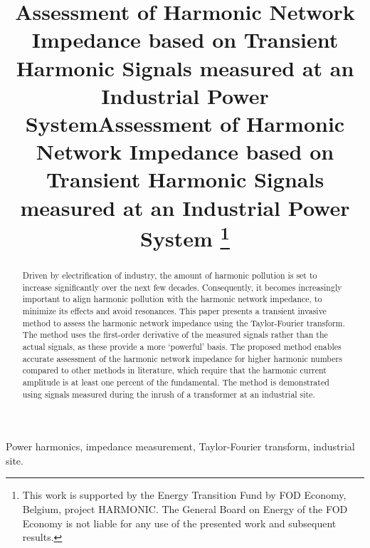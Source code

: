 \documentclass[conference]{IEEEtran}
\begin{document}
\title{Assessment of Harmonic Network Impedance based on Transient Harmonic Signals measured at an Industrial Power System}

\title{Assessment of Harmonic Network Impedance based on Transient Harmonic Signals measured at an Industrial Power System
\thanks{This work is supported by the Energy Transition Fund by FOD Economy, Belgium, project HARMONIC. The General Board on Energy of the FOD Economy is not liable for any use of the presented work and subsequent results.}}

\author{
\and
{}
\and
{}
}

\maketitle


\begin{abstract}
Driven by electrification of industry, the amount of harmonic pollution is set to increase significantly over the next few decades. Consequently, it becomes increasingly important to align harmonic pollution with the harmonic network impedance, to minimize its effects and avoid resonances. This paper presents a transient invasive method to assess the harmonic network impedance using the Taylor-Fourier transform. The method uses the first-order derivative of the measured signals rather than the actual signals, as these provide a more `powerful' basis. The proposed method enables accurate assessment of the harmonic network impedance for higher harmonic numbers compared to other methods in literature, which require that the harmonic current amplitude is at least one percent of the fundamental. The method is demonstrated using signals measured during the inrush of a transformer at an industrial site.
\end{abstract}
\begin{IEEEkeywords}
    Power harmonics, impedance measurement, Taylor-Fourier transform, industrial site.
\end{IEEEkeywords}
\maketitle
\end{document}
